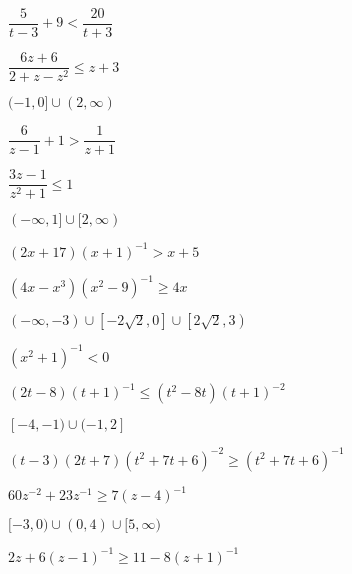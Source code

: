 \documentclass{ximera}
\begin{document}
\begin{question}
\begin{problem}
$\dfrac{5}{t-3} + 9 < \dfrac{20}{t+3}$
\end{problem}

\begin{problem}
$\dfrac{6z+6}{2+z-z^2} \leq z+3$

\begin{solution}
$(-1,0] \cup (2, \infty)$    
\end{solution}
\end{problem}  

\begin{problem}
$\dfrac{6}{z-1} + 1 > \dfrac{1}{z+1}$
\end{problem}  

\begin{problem}
$\dfrac{3z - 1}{z^{2} + 1} \leq 1$

\begin{solution}
$(-\infty, 1] \cup [2, \infty)$
\end{solution}
\end{problem}

\begin{problem}
$(2x+17)(x+1)^{-1} > x + 5$
\end{problem} 

\begin{problem}
$(4x-x^3)(x^{2} - 9)^{-1} \geq 4x$

\begin{solution}
$(-\infty, -3) \cup \left[-2\sqrt{2}, 0\right] \cup \left[2\sqrt{2}, 3\right)$
\end{solution}
\end{problem} 

\begin{problem}
$(x^{2} + 1)^{-1} < 0$
\end{problem}  

\begin{problem}
$(2t-8)(t+1)^{-1} \leq (t^2-8t)(t+1)^{-2}$ 

\begin{solution}
$[-4, -1) \cup (-1,2]$
\end{solution}
\end{problem}  

\begin{problem}
$(t-3)(2t+7)(t^2+7t+6)^{-2} \geq (t^2+7t+6)^{-1}$ %
\end{problem} 

\begin{problem}
$60z^{-2}+23z^{-1} \geq 7(z-4)^{-1}$

\begin{solution}
$[-3,0) \cup (0,4) \cup [5, \infty)$
\end{solution}
\end{problem} 

\begin{problem}\label{ratlineqexerciselast}
$2z+6(z-1)^{-1} \geq 11 - 8(z+1)^{-1}$
\end{problem}  
\end{question}
\end{document}
